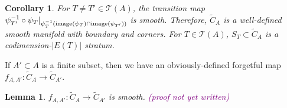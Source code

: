 \documentclass[11pt]{article}
\newtheorem{lmm}[thm]{Lemma}
\newtheorem{crl}[thm]{Corollary}
\theoremstyle{definition}
\theoremstyle{remark}
\def\wt#1{\widetilde{#1}}
\def\cT{\mathcal{T}}
\def\cmt#1{\textcolor{purple}{(#1)}}
\def\tn#1{\textnormal{#1}}
\begin{document}
\begin{crl}
For $T\neq T'\in \cT(A)$, the transition map $\psi_{T'}^{-1}\circ\psi_{T}|_{\psi_T^{-1}(\tn{image}(\psi_T)\cap\tn{image}(\psi_{T'}))}$ is smooth. 
Therefore, $\wt{C}_A$ is a well-defined smooth manifold with boundary and corners. For $T\in\cT(A)$, $S_T\subset \wt{C}_A$ is a codimension-$|E(T)|$ stratum. 
\end{crl}

If $A'\subset A$ is a finite subset, then we have an obviously-defined forgetful map $f_{A,A'}:\wt{C}_A\to\wt{C}_{A'}$. 

\begin{lmm}
$f_{A,A'}:\wt{C}_A\to\wt{C}_{A'}$ is smooth. \cmt{proof not yet written}
\end{lmm}
\end{document}
